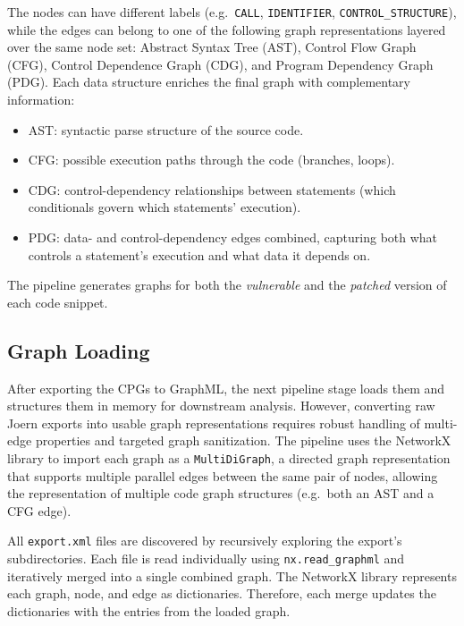 The nodes can have different labels (e.g.\ \verb|CALL|, \verb|IDENTIFIER|, \verb|CONTROL_STRUCTURE|), while the edges can belong to one of the following graph representations layered over the same node set: 
Abstract Syntax Tree (AST), Control Flow Graph (CFG), Control Dependence Graph (CDG), and Program Dependency Graph (PDG). Each data structure enriches the final graph with complementary information:
\begin{itemize}
    \item AST: syntactic parse structure of the source code.
    \item CFG: possible execution paths through the code (branches, loops).
    \item CDG: control-dependency relationships between statements (which conditionals govern which statements' execution).
    \item PDG: data- and control-dependency edges combined, capturing both what controls a statement's execution and what data it depends on.
\end{itemize}


The pipeline generates graphs for both the \textit{vulnerable} and the \textit{patched} version of each code snippet.  


\subsection{Graph Loading}
After exporting the CPGs to GraphML, the next pipeline stage loads them and structures them in memory for downstream analysis. 
However, converting raw Joern exports into usable graph representations requires robust handling of multi-edge properties and targeted graph sanitization.
The pipeline uses the NetworkX library to import each graph as a \verb|MultiDiGraph|, a directed graph representation that supports multiple parallel edges between the same pair of nodes, allowing the representation of multiple code graph structures (e.g.\ both an AST and a CFG edge).

All  \verb|export.xml| files are discovered by recursively exploring the export's subdirectories. 
Each file is read individually using \verb|nx.read_graphml| and iteratively merged into a single combined graph. 
The NetworkX library represents each graph, node, and edge as dictionaries. Therefore, each merge updates the dictionaries with the entries from the loaded graph.

